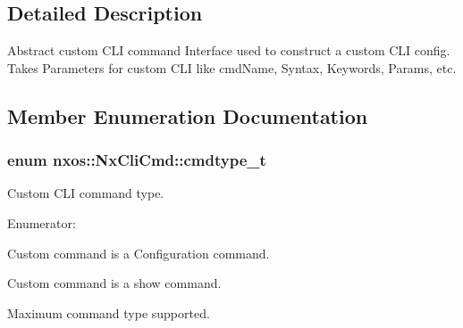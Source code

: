 \subsection{Detailed Description}
Abstract custom CLI command Interface used to construct a custom CLI config. Takes Parameters for custom CLI like cmdName, Syntax, Keywords, Params, etc. 

\subsection{Member Enumeration Documentation}
\hypertarget{classnxos_1_1NxCliCmd_a82ed104f13c7859b24d3c0527f706be1}{
\subsubsection[{cmdtype\_\-t}]{\setlength{\rightskip}{0pt plus 5cm}enum {\bf nxos::NxCliCmd::cmdtype\_\-t}}}
\label{classnxos_1_1NxCliCmd_a82ed104f13c7859b24d3c0527f706be1}


Custom CLI command type. \begin{Desc}
\item[Enumerator: ]\par
\begin{description}
\item[{\em 
\hypertarget{classnxos_1_1NxCliCmd_a82ed104f13c7859b24d3c0527f706be1a95032ccdb393e24e4a57a330b3ba3142}{
CONF\_\-CMD}
\label{classnxos_1_1NxCliCmd_a82ed104f13c7859b24d3c0527f706be1a95032ccdb393e24e4a57a330b3ba3142}
}]Custom command is a Configuration command. \item[{\em 
\hypertarget{classnxos_1_1NxCliCmd_a82ed104f13c7859b24d3c0527f706be1a07e42d83caddae06870cbf324da56bbe}{
SHOW\_\-CMD}
\label{classnxos_1_1NxCliCmd_a82ed104f13c7859b24d3c0527f706be1a07e42d83caddae06870cbf324da56bbe}
}]Custom command is a show command. \item[{\em 
\hypertarget{classnxos_1_1NxCliCmd_a82ed104f13c7859b24d3c0527f706be1a09e26af6ee427940926af9bd7ef2e73d}{
MAX\_\-CMD}
\label{classnxos_1_1NxCliCmd_a82ed104f13c7859b24d3c0527f706be1a09e26af6ee427940926af9bd7ef2e73d}
}]Maximum command type supported. \end{description}
\end{Desc}


